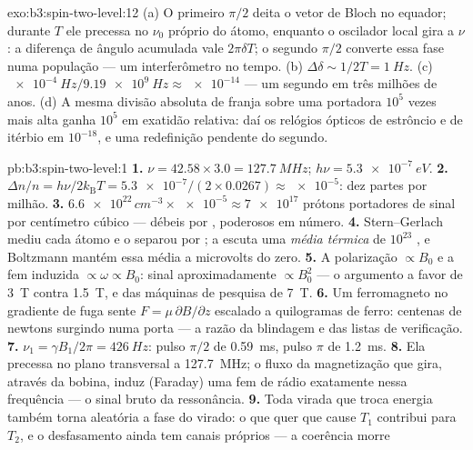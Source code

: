 \begin{solution}{exo:b3:spin-two-level:12}
(a) O primeiro $\pi/2$ deita o vetor de Bloch no equador; durante
$T$ ele precessa no $\nu_0$ próprio do átomo, enquanto o oscilador
local gira a $\nu$: a diferença de ângulo acumulada vale
$2\pi\delta T$; o segundo $\pi/2$ converte essa fase numa população
--- um interferômetro no tempo. (b) $\Delta\delta \sim
1/2T = \qty{1}{Hz}$. (c) $\qty{e-4}{Hz}/\qty{9.19e9}{Hz} \approx
\num{e-14}$ --- um segundo em três milhões de anos. (d) A mesma divisão
absoluta de franja sobre uma portadora $10^5$ vezes mais alta ganha
$10^5$ em exatidão relativa: daí os relógios ópticos de estrôncio e de
itérbio em $10^{-18}$, e uma redefinição pendente do segundo.
\end{solution}

\begin{solution}{pb:b3:spin-two-level:1}
\textbf{1.} $\nu = 42.58 \times 3.0 = \qty{127.7}{MHz}$; $h\nu =
\qty{5.3e-7}{eV}$.
\textbf{2.} $\Delta n/n = h\nu/2k_{\text{B}}T = \num{5.3e-7}/(2
\times 0.0267) \approx \num{e-5}$: dez partes por milhão.
\textbf{3.} $\num{6.6e22}\,\unit{cm^{-3}} \times \num{e-5} \approx
\num{7e17}$ prótons portadores de sinal por centímetro cúbico ---
débeis por , poderosos em número.
\textbf{4.} Stern--Gerlach mediu cada átomo e o separou por ;
a  escuta uma \emph{média térmica} de $10^{23}$
, e Boltzmann mantém essa média a microvolts do zero.
\textbf{5.} A polarização $\propto B_0$ e a fem induzida
$\propto \omega \propto B_0$: sinal aproximadamente $\propto B_0^2$ ---
o argumento a favor de \qty{3}{T} contra \qty{1.5}{T}, e das máquinas
de pesquisa de \qty{7}{T}.
\textbf{6.} Um ferromagneto no gradiente de fuga sente
$F = \mu\,\partial B/\partial z$ escalado a quilogramas de ferro:
centenas de newtons surgindo numa porta --- a razão da blindagem e das
listas de verificação.
\textbf{7.} $\nu_1 = \gamma B_1/2\pi = \qty{426}{Hz}$: pulso $\pi/2$ de
\qty{0.59}{ms}, pulso $\pi$ de \qty{1.2}{ms}.
\textbf{8.} Ela precessa no plano transversal a \qty{127.7}{MHz}; o
fluxo da magnetização que gira, através da bobina, induz (Faraday) uma
fem de rádio exatamente nessa frequência --- o sinal bruto da
ressonância.
\textbf{9.} Toda virada que troca energia também torna aleatória a
fase do  virado: o que quer que cause $T_1$ contribui para $T_2$, e
o desfasamento ainda tem canais próprios --- a coerência morre

\end{solution}
